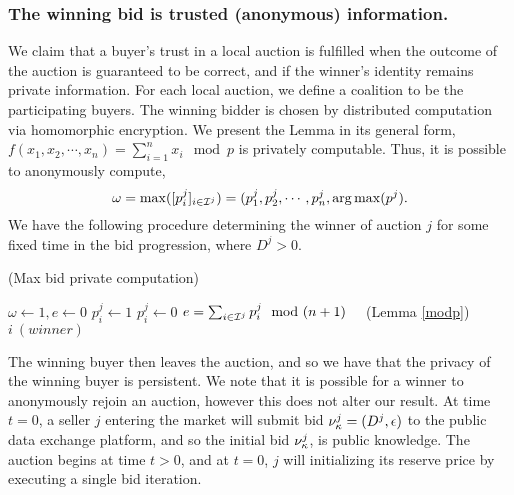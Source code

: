 \subsubsection{The winning bid is trusted (anonymous) information.}
We claim that a buyer's trust in a local auction is fulfilled when the outcome of
the auction is guaranteed to be correct, and if the winner's identity remains private information. For each local auction, we define a coalition to be the
participating buyers. The winning bidder is chosen by
distributed computation via homomorphic encryption. We present the Lemma in its general form,
{
\label{modp} \ 
    $f(x_1, x_2, \cdots, x_n) = \sum_{i=1}^n x_i \mod p$ is privately
    computable.
}
Thus, it is possible to anonymously compute,
\begin{equation}\label{winner}
    \omega = \max([p_i^j]_{i\in\mathcal{I}^j}) = (p_1^j, p_2^j, \cdots, p_n^j, \operatorname*{arg\,max}(p^j).
\end{equation}
We have the following procedure determining the winner of auction $j$ for
some fixed time in the bid progression, where $D^j > 0$.
\begin{center}
\begin{algorithm}
\caption{(Max bid private computation)}
\begin{algorithmic}[1]\label{maxbidcomp}
\State $\omega\gets 1, e\gets 0$
\State $p_i^j \gets 1 $
\Else
\State $p_i^j \gets 0$
\EndIf
\EndFor
\State $e = \sum_{i\in\mathcal{I}^j} p_i^j \mod (n+1)\quad$ (Lemma \ref{modp})
\For{$i \in \mcI^j$}
\Return $i \ (winner)$
\EndIf
\EndFor
\EndWhile\\
\end{algorithmic}
\end{algorithm}
\end{center}


The winning buyer then leaves the auction, and so we have that the privacy of
the winning buyer is persistent. We note that it is possible for a winner to
anonymously rejoin an auction, however this does not alter our result. At time
$t=0$, a seller $j$ entering the market will
submit bid $\nu_\kappa^j =(D^j, \epsilon)$ to the public data exchange
platform, and so the initial bid $\nu_\kappa^j$, is public knowledge. 
The auction begins at time $t>0$, and at $t=0$, $j$ will
initializing its reserve price by executing a single bid iteration.


